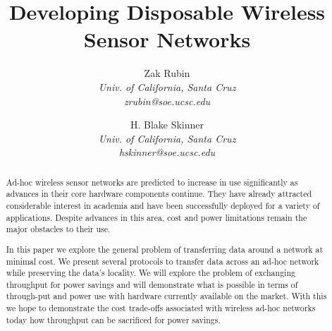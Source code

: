 \documentclass[10pt,twocolumn]{article}
\begin{document}
\title{Developing Disposable Wireless Sensor Networks}

\author{
Zak Rubin \\
\textit{Univ. of California, Santa Cruz} \\
\textit{zrubin@soe.ucsc.edu}
\and
H. Blake Skinner \\
\textit{Univ. of California, Santa Cruz} \\
\textit{hskinner@soe.ucsc.edu}
}

\maketitle
\thispagestyle{empty}

\begin{abstract}
Ad-hoc wireless sensor networks are predicted to increase in use significantly as advances in their core
hardware components continue.  They have already attracted considerable interest in academia and have
been successfully deployed for a variety of applications.  Despite advances in this area, cost and power
limitations remain the major obstacles to their use.

In this paper we explore the general problem of transferring data around a network
at minimal cost.  We present several protocols to transfer data across an ad-hoc network while
preserving the data's locality.  We will explore the problem of exchanging throughput for power
savings and will demonstrate what is possible in terms of through-put and power use with hardware
currently available on the market.  With this we hope to demonstrate the cost trade-offs associated
with wireless ad-hoc networks today how throughput can be sacrificed for power savings.
\end{abstract}












\end{document}
